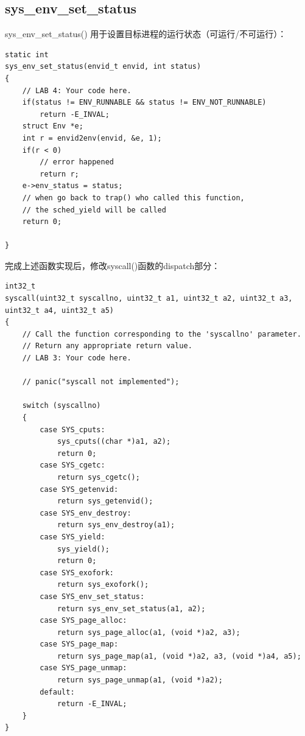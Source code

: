 \documentclass[12pt, letterpaper]{report}
\begin{document}
\subsection{\large sys\_env\_set\_status}
sys\_env\_set\_status() 用于设置目标进程的运行状态（可运行/不可运行）：\par 
\lstset{style=CStyle}
\setmainfont{Consolas}
\begin{lstlisting}
static int
sys_env_set_status(envid_t envid, int status)
{
    // LAB 4: Your code here.
    if(status != ENV_RUNNABLE && status != ENV_NOT_RUNNABLE)
        return -E_INVAL;
    struct Env *e;
    int r = envid2env(envid, &e, 1);
    if(r < 0)
        // error happened
        return r;
    e->env_status = status;
    // when go back to trap() who called this function,
    // the sched_yield will be called
    return 0;

}
\end{lstlisting}
\setmainfont{Times New Roman}

\newpage
完成上述函数实现后，修改syscall()函数的dispatch部分：\par 
\lstset{style=CStyle}
\setmainfont{Consolas}
\begin{lstlisting}
int32_t
syscall(uint32_t syscallno, uint32_t a1, uint32_t a2, uint32_t a3, uint32_t a4, uint32_t a5)
{
    // Call the function corresponding to the 'syscallno' parameter.
    // Return any appropriate return value.
    // LAB 3: Your code here.

    // panic("syscall not implemented");

    switch (syscallno) 
    {
        case SYS_cputs:
            sys_cputs((char *)a1, a2);
            return 0;
        case SYS_cgetc:
            return sys_cgetc();
        case SYS_getenvid:
            return sys_getenvid();
        case SYS_env_destroy:
            return sys_env_destroy(a1);
        case SYS_yield:
            sys_yield();
            return 0;
        case SYS_exofork:
            return sys_exofork();
        case SYS_env_set_status:
            return sys_env_set_status(a1, a2);
        case SYS_page_alloc:
            return sys_page_alloc(a1, (void *)a2, a3);
        case SYS_page_map:
            return sys_page_map(a1, (void *)a2, a3, (void *)a4, a5);
        case SYS_page_unmap:
            return sys_page_unmap(a1, (void *)a2);
        default:
            return -E_INVAL;
    }
}
\end{lstlisting}
\setmainfont{Times New Roman}
\end{document}

